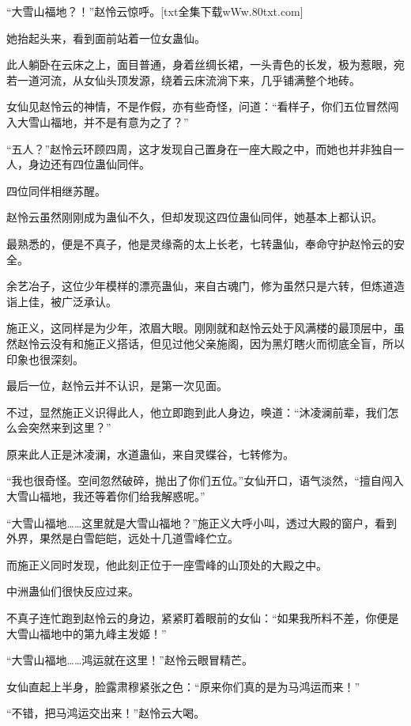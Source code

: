 
\begin{this_body}

“大雪山福地？！”赵怜云惊呼。[txt全集下载wWw.80txt.com]

她抬起头来，看到面前站着一位女蛊仙。

此人躺卧在云床之上，面目普通，身着丝绸长裙，一头青色的长发，极为惹眼，宛若一道河流，从女仙头顶发源，绕着云床流淌下来，几乎铺满整个地砖。

女仙见赵怜云的神情，不是作假，亦有些奇怪，问道：“看样子，你们五位冒然闯入大雪山福地，并不是有意为之了？”

“五人？”赵怜云环顾四周，这才发现自己置身在一座大殿之中，而她也并非独自一人，身边还有四位蛊仙同伴。

四位同伴相继苏醒。

赵怜云虽然刚刚成为蛊仙不久，但却发现这四位蛊仙同伴，她基本上都认识。

最熟悉的，便是不真子，他是灵缘斋的太上长老，七转蛊仙，奉命守护赵怜云的安全。

余艺冶子，这位少年模样的漂亮蛊仙，来自古魂门，修为虽然只是六转，但炼道造诣上佳，被广泛承认。

施正义，这同样是为少年，浓眉大眼。刚刚就和赵怜云处于风满楼的最顶层中，虽然赵怜云没有和施正义搭话，但见过他父亲施阁，因为黑灯瞎火而彻底全盲，所以印象也很深刻。

最后一位，赵怜云并不认识，是第一次见面。

不过，显然施正义识得此人，他立即跑到此人身边，唤道：“沐凌澜前辈，我们怎么会突然来到这里？”

原来此人正是沐凌澜，水道蛊仙，来自灵蝶谷，七转修为。

“我也很奇怪。空间忽然破碎，抛出了你们五位。”女仙开口，语气淡然，“擅自闯入大雪山福地，我还等着你们给我解惑呢。”

“大雪山福地……这里就是大雪山福地？”施正义大呼小叫，透过大殿的窗户，看到外界，果然是白雪皑皑，远处十几道雪峰伫立。

而施正义同时发现，他此刻正位于一座雪峰的山顶处的大殿之中。

中洲蛊仙们很快反应过来。

不真子连忙跑到赵怜云的身边，紧紧盯着眼前的女仙：“如果我所料不差，你便是大雪山福地中的第九峰主发姬！”

“大雪山福地……鸿运就在这里！”赵怜云眼冒精芒。

女仙直起上半身，脸露肃穆紧张之色：“原来你们真的是为马鸿运而来！”

“不错，把马鸿运交出来！”赵怜云大喝。


\end{this_body}
